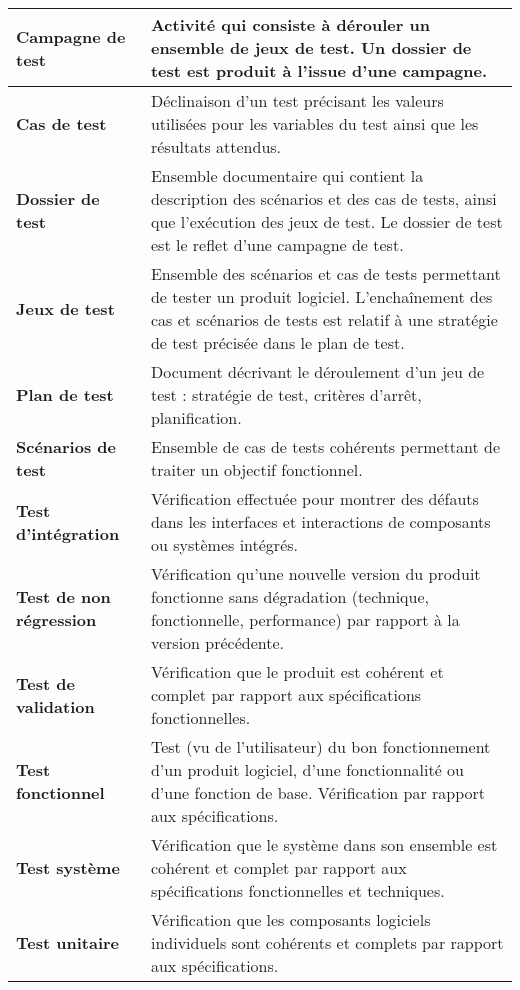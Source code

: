 \noindent\begin{longtable}[c]{|p{}|p{}|}
\hline
{\bf Campagne de test} & Activité qui consiste à dérouler un ensemble de jeux de test. Un dossier de test est produit à l'issue d'une campagne.\\
\hline
{\bf Cas de test} & Déclinaison d'un test précisant les valeurs utilisées pour les variables du test ainsi que les résultats attendus.\\
\hline
{\bf Dossier de test} & Ensemble documentaire qui contient la description des scénarios et des cas de tests, ainsi que l'exécution des jeux de test. Le dossier de test est le reflet d'une campagne de test. \\
\hline
{\bf Jeux de test} & Ensemble des scénarios et cas de tests permettant de tester un produit logiciel. L'enchaînement des cas et scénarios de tests est relatif à une stratégie de test précisée dans le plan de test.\\
\hline
{\bf Plan de test} & Document décrivant le déroulement d'un jeu de test : stratégie de test, critères d'arrêt, planification.\\
\hline
{\bf Scénarios de test} & Ensemble de cas de tests cohérents permettant de traiter un objectif fonctionnel.\\
\hline
{\bf Test d'intégration} & Vérification effectuée pour montrer des défauts dans les interfaces et interactions de composants ou systèmes intégrés.\\
\hline
{\bf Test de non régression} & Vérification qu'une nouvelle version du produit fonctionne sans dégradation (technique, fonctionnelle, performance) par rapport à la version précédente.\\
\hline
{\bf Test de validation} & Vérification que le produit est cohérent et complet par rapport aux spécifications fonctionnelles.\\
\hline
{\bf Test fonctionnel} & Test (vu de l'utilisateur) du bon fonctionnement d'un produit logiciel, d'une fonctionnalité ou d'une fonction de base. Vérification par rapport aux spécifications.\\
\hline
{\bf Test système} & Vérification que le système dans son ensemble est cohérent et complet par rapport aux spécifications fonctionnelles et techniques.\\
\hline
{\bf Test unitaire} & Vérification que les composants logiciels individuels sont cohérents et complets par rapport aux spécifications.\\
\hline
\end{longtable}

